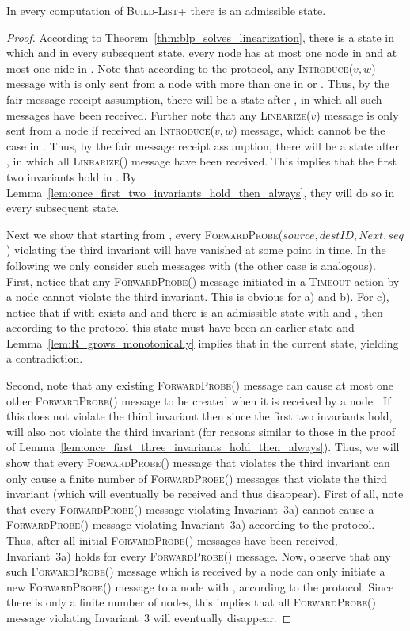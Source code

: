 \documentclass[a4paper,USenglish]{lipics}
\newcommand{\blp}{\textsc{Build-List+}\xspace}
\newcommand{\linearize}[1]{\textsc{Linearize(\ensuremath{#1})}\xspace}
\newcommand{\introduce}[1]{\textsc{Introduce(\ensuremath{#1})}\xspace}
\newcommand{\timeout}{\textsc{Timeout}\xspace}
\newcommand{\forwardprobe}[1]{\textsc{ForwardProbe(\ensuremath{#1})}\xspace}
\begin{document}
\begin{lemma}\label{lem:admissible_state_always_exists}
 In every computation of \blp there is an admissible state.
\end{lemma}

\begin{proof}
According to Theorem~\ref{thm:blp_solves_linearization}, there is a state  in which and in every subsequent state, every node  has at most one node in  and at most one nide in .
Note that according to the protocol, any \introduce{v,w} message with  is only sent from a node  with more than one in  or .
Thus, by the fair message receipt assumption, there will be a state  after , in which all such messages have been received.
Further note that any \linearize{v} message is only sent from a node  if  received an \introduce{v,w} message, which cannot be the case in .
Thus, by the fair message receipt assumption, there will be a state  after , in which all \linearize{} message have been received.
This implies that the first two invariants hold in .
By Lemma~\ref{lem:once_first_two_invariants_hold_then_always}, they will do so in every subsequent state.

Next we show that starting from , every \forwardprobe{source,destID,Next,seq} violating the third invariant will have vanished at some point in time.
In the following we only consider such messages with  (the other case is analogous).
First, notice that any \forwardprobe{} message initiated in a \timeout action by a node  cannot violate the third invariant.
This is obvious for a) and b).
For c), notice that if  with  exists and  and there is an admissible state with  and , then according to the protocol this state must have been an earlier state and Lemma~\ref{lem:R_grows_monotonically} implies that  in the current state, yielding a contradiction.


Second, note that any existing \forwardprobe{} message  can cause at most one other \forwardprobe{} message  to be created when it is received by a node .
If this  does not violate the third invariant then since the first two invariants hold,  will also not violate the third invariant (for reasons similar to those in the proof of Lemma~\ref{lem:once_first_three_invariants_hold_then_always}).
Thus, we will show that every \forwardprobe{} message that violates the third invariant can only cause a finite number of \forwardprobe{} messages that violate the third invariant (which will eventually be received and thus disappear).
First of all, note that every \forwardprobe{} message  violating Invariant~3a) cannot cause a \forwardprobe{} message  violating Invariant~3a) according to the protocol.
Thus, after all initial \forwardprobe{} messages have been received, Invariant~3a) holds for every \forwardprobe{} message.
Now, observe that any such \forwardprobe{} message which is received by a node  can only initiate a new \forwardprobe{} message to a node  with , according to the protocol.
Since there is only a finite number of nodes, this implies that all \forwardprobe{} message violating Invariant~3 will eventually disappear.


\end{proof}
\end{document}
